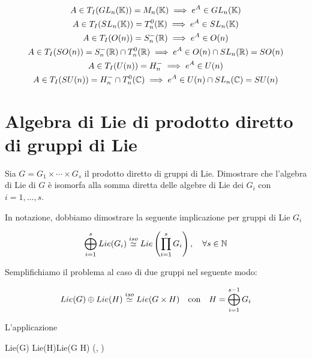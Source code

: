 \begin{gather}
	A \in T_{I}(GL_{n}(\K)) = M_{n}(\K) %
	\implies e^{A} \in GL_{n}(\K) \\
	A \in T_{I}(SL_{n}(\K)) = T^{0}_{n}(\K) %
	\implies e^{A} \in SL_{n}(\K) \\
	A \in T_{I}(O(n)) = S^{-}_{n}(\R) %
	\implies e^{A} \in O(n) \\
	A \in T_{I}(SO(n)) = S^{-}_{n}(\R) \cap T^{0}_{n}(\R) %
	\implies e^{A} \in O(n) \cap SL_{n}(\R) = SO(n) \\
	A \in T_{I}(U(n)) = H^{-}_{n} %
	\implies e^{A} \in U(n) \\
	A \in T_{I}(SU(n)) = H^{-}_{n} \cap T^{0}_{n}(\C) %
	\implies e^{A} \in U(n) \cap SL_{n}(\C) = SU(n)
\end{gather}

%

\newpage

%

\section{Algebra di Lie di prodotto diretto di gruppi di Lie}\label{es3-11}

\begin{tcolorbox}
	Sia $ G = G_{1} \times \cdots \times G_{s} $ il prodotto diretto di gruppi di Lie. Dimostrare che l'algebra di Lie di $ G $ è isomorfa alla somma diretta delle algebre di Lie dei $ G_{i} $ con $ i=1,\dots,s $.
\end{tcolorbox}


In notazione, dobbiamo dimostrare la seguente implicazione per gruppi di Lie $ G_{i} $

\begin{equation}
	\bigoplus_{i=1}^{s} Lie(G_{i}) \stackrel{iso}{\simeq} Lie \left( \prod_{i=1}^{s} G_{i} \right) %
	\qcomma \forall s \in \N
\end{equation}

Semplifichiamo il problema al caso di due gruppi nel seguente modo:

\begin{equation}
	Lie(G) \oplus Lie(H) \stackrel{iso}{\simeq} Lie(G \times H) %
	\qq{con} %
	H = \bigoplus_{i=1}^{s-1} G_{i}
\end{equation}

L'applicazione

\map{\psi}
	{Lie(G) \oplus Lie(H)}{Lie(G \times H)}
	{(\xi, \eta)}{\xi \oplus \eta}

